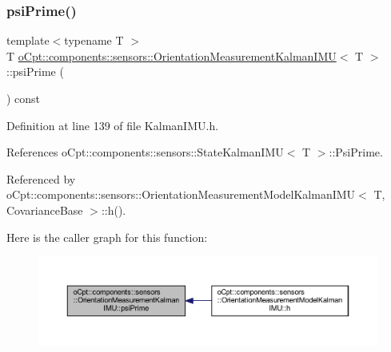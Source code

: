 \subsubsection{\texorpdfstring{psi\+Prime()}{psiPrime()}\hspace{0.1cm}{\footnotesize\ttfamily [1/2]}}
{\footnotesize\ttfamily template$<$typename T $>$ \\
T \hyperlink{classo_cpt_1_1components_1_1sensors_1_1_orientation_measurement_kalman_i_m_u}{o\+Cpt\+::components\+::sensors\+::\+Orientation\+Measurement\+Kalman\+I\+MU}$<$ T $>$\+::psi\+Prime (\begin{DoxyParamCaption}{ }\end{DoxyParamCaption}) const\hspace{0.3cm}{\ttfamily [inline]}}



Definition at line 139 of file Kalman\+I\+M\+U.\+h.



References o\+Cpt\+::components\+::sensors\+::\+State\+Kalman\+I\+M\+U$<$ T $>$\+::\+Psi\+Prime.



Referenced by o\+Cpt\+::components\+::sensors\+::\+Orientation\+Measurement\+Model\+Kalman\+I\+M\+U$<$ T, Covariance\+Base $>$\+::h().

Here is the caller graph for this function\+:
\nopagebreak
\begin{figure}[H]
\begin{center}
\leavevmode
\includegraphics[width=350pt]{classo_cpt_1_1components_1_1sensors_1_1_orientation_measurement_kalman_i_m_u_aad73d00dc09c0f0da00f28b9ac703c52_icgraph}
\end{center}
\end{figure}
\hypertarget{classo_cpt_1_1components_1_1sensors_1_1_orientation_measurement_kalman_i_m_u_a3ef9614b993fc4bff6323fb83d698ef7}{}\label{classo_cpt_1_1components_1_1sensors_1_1_orientation_measurement_kalman_i_m_u_a3ef9614b993fc4bff6323fb83d698ef7} 

